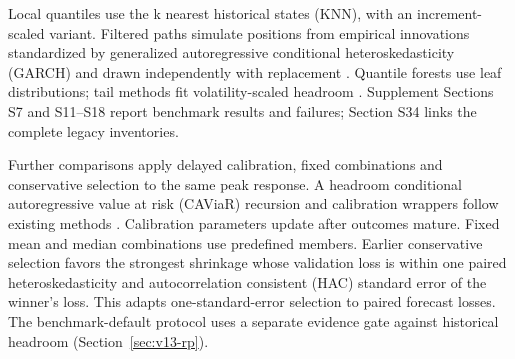 \documentclass[11pt,a4paper]{article}
\begin{document}
Local quantiles use the k nearest historical states (KNN), with an increment-scaled variant. Filtered paths simulate positions from empirical innovations standardized by generalized autoregressive conditional heteroskedasticity (GARCH) and drawn independently with replacement \citep{hull1998,barone1999}. Quantile forests use leaf distributions; tail methods fit volatility-scaled headroom \citep{meinshausen2006,mcneilfrey2000}. Supplement Sections S7 and S11--S18 report benchmark results and failures; Section S34 links the complete legacy inventories.

Further comparisons apply delayed calibration, fixed combinations and conservative selection to the same peak response. A headroom conditional autoregressive value at risk (CAViaR) recursion and calibration wrappers follow existing methods \citep{engle2004,gibbs2021}. Calibration parameters update after outcomes mature. Fixed mean and median combinations use predefined members. Earlier conservative selection favors the strongest shrinkage whose validation loss is within one paired heteroskedasticity and autocorrelation consistent (HAC) standard error of the winner's loss. This adapts one-standard-error selection \citep{hastie2009} to paired forecast losses. The benchmark-default protocol uses a separate evidence gate against historical headroom (Section~\ref{sec:v13-rp}).
\end{document}
